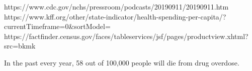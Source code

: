 \documentclass[11pt,letterpaper]{article}
\begin{document}
https://www.cdc.gov/nchs/pressroom/podcasts/20190911/20190911.htm
https://www.kff.org/other/state-indicator/health-spending-per-capita/?currentTimeframe=0&sortModel=%
https://factfinder.census.gov/faces/tableservices/jsf/pages/productview.xhtml?src=bkmk

In the past every year, 58 out of 100,000 people will die from drug overdose.
\end{document}
